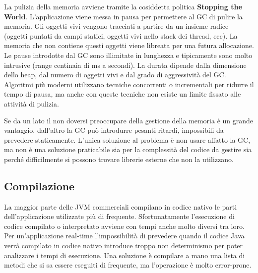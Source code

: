 La pulizia della memoria avviene tramite la cosiddetta politica \textbf{Stopping the World}. L'applicazione viene messa in pausa per permettere al GC di pulire la memoria. Gli oggetti vivi vengono tracciati a partire da un insieme radice (oggetti puntati da campi statici, oggetti vivi nello stack dei thread, ecc). La memoria che non contiene questi oggetti viene libreata per una futura allocazione. Le pause introdotte dal GC sono illimitate in lunghezza e tipicamente sono molto intrusive (range centinaia di ms a secondi). La durata dipende dalla dimensione dello heap, dal numero di oggetti vivi e dal grado di aggressività del GC. Algoritmi più moderni utilizzano tecniche concorrenti o incrementali per ridurre il tempo di pausa, ma anche con queste tecniche non esiste un limite fissato alle attività di pulizia.

Se da un lato il non doversi preoccupare della gestione della memoria è un grande vantaggio, dall'altro la GC può introdurre pesanti ritardi, impossibili da prevedere staticamente. L'unica soluzione al problema è non usare affatto la GC, ma non è una soluzione praticabile sia per la complessità del codice da gestire sia perché difficilmente si possono trovare librerie esterne che non la utilizzano.

\subsection{Compilazione}
La maggior parte delle JVM commerciali compilano in codice nativo le parti dell'applicazione utilizzate più di frequente. Sfortunatamente l'esecuzione di codice compilato o interpretato avviene con tempi anche molto diversi tra loro. Per un'applicazione real-time l'impossibilità di prevedere quando il codice Java verrà compilato in codice nativo introduce troppo non determinismo per poter analizzare i tempi di esecuzione. Una soluzione è compilare a mano una lista di metodi che si sa essere eseguiti di frequente, ma l'operazione è molto error-prone.